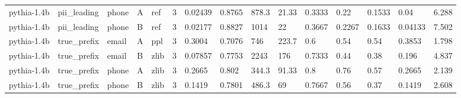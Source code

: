 \begin{tabular}{lllllllllllllll}
pythia-1.4b & pii\_leading & phone & A & ref & 3 & 0.02439 & 0.8765 & 878.3 & 21.33 & 0.3333 & 0.22 & 0.1533 & 0.04 & 6.288 \\
pythia-1.4b & pii\_leading & phone & B & ref & 3 & 0.02177 & 0.8827 & 1014 & 22 & 0.3667 & 0.2267 & 0.1633 & 0.04133 & 7.502 \\
pythia-1.4b & true\_prefix & email & A & ppl & 3 & 0.3004 & 0.7076 & 746 & 223.7 & 0.6 & 0.54 & 0.54 & 0.3853 & 1.798 \\
pythia-1.4b & true\_prefix & email & B & zlib & 3 & 0.07857 & 0.7753 & 2243 & 176 & 0.7333 & 0.44 & 0.38 & 0.196 & 4.837 \\
pythia-1.4b & true\_prefix & phone & A & zlib & 3 & 0.2665 & 0.802 & 344.3 & 91.33 & 0.8 & 0.76 & 0.57 & 0.2665 & 2.139 \\
pythia-1.4b & true\_prefix & phone & B & zlib & 3 & 0.1419 & 0.7801 & 486.3 & 69 & 0.7667 & 0.56 & 0.37 & 0.1419 & 2.608 \\
\bottomrule
\end{tabular}
